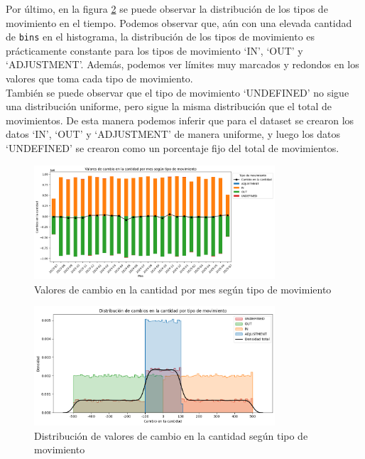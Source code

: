 Por último, en la figura \ref{fig:distribucion_tipos_de_mov} se puede observar la distribución de los tipos de movimiento en el tiempo. Podemos observar que, aún con una elevada cantidad de \texttt{bins} en el histograma, la distribución de los tipos de movimiento es prácticamente constante para los tipos de movimiento `IN', `OUT' y `ADJUSTMENT'. Además, podemos ver límites muy marcados y redondos en los valores que toma cada tipo de movimiento. \\
También se puede observar que el tipo de movimiento `UNDEFINED' no sigue una distribución uniforme, pero sigue la misma distribución que el total de movimientos. De esta manera podemos inferir que para el dataset se crearon los datos `IN', `OUT' y `ADJUSTMENT' de manera uniforme, y luego los datos `UNDEFINED' se crearon como un porcentaje fijo del total de movimientos.

\begin{figure}[H]
    \centering
    \includegraphics[width=0.8\textwidth]{imagenes/datos_uniformes/cambios_cantidad_mes.png}
    \caption{Valores de cambio en la cantidad por mes según tipo de movimiento}
    \label{fig:cambios_cantidad_mes}
\end{figure}

\begin{figure}[H]
    \centering
    \includegraphics[width=0.8\textwidth]{imagenes/datos_uniformes/distribucion_tipos_de_mov.png}
    \caption{Distribución de valores de cambio en la cantidad según tipo de movimiento}
    \label{fig:distribucion_tipos_de_mov}
\end{figure}
